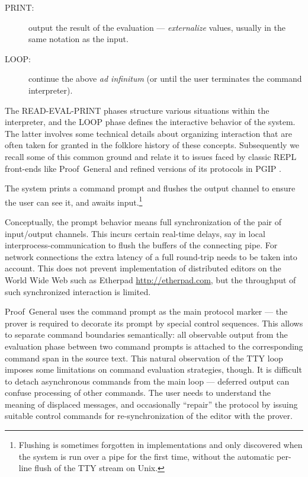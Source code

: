 \begin{isabellebody}
\begin{isamarkuptext}
\begin{description}
  \item[PRINT:] output the result of the evaluation ---
  \emph{externalize} values, usually in the same notation as the
  input.

  \item[LOOP:] continue the above \emph{ad infinitum} (or until the user
  terminates the command interpreter).

  \end{description}

  The READ-EVAL-PRINT phases structure various situations within the
  interpreter, and the LOOP phase defines the interactive behavior of
  the system.  The latter involves some technical details about
  organizing interaction that are often taken for granted in the
  folklore history of these concepts.  Subsequently we recall some of
  this common ground and relate it to issues faced by classic REPL
  front-ends like Proof~General \cite{Aspinall:TACAS:2000} and refined
  versions of its protocols in PGIP \cite{Aspinall-et-al:2007}.

   The system prints a command prompt and flushes the
  output channel to ensure the user can see it, and awaits
  input.\footnote{Flushing is sometimes forgotten in implementations
  and only discovered when the system is run over a pipe for the first
  time, without the automatic per-line flush of the TTY stream on
  Unix.}

  Conceptually, the prompt behavior means full synchronization of the
  pair of input/output channels.  This incurs certain real-time
  delays, say in local interprocess-communication to flush the buffers
  of the connecting pipe.  For network connections the extra latency
  of a full round-trip needs to be taken into account.  This does not
  prevent implementation of distributed editors on the World Wide Web
  such as Etherpad \url{http://etherpad.com}, but the throughput of
  such synchronized interaction is limited.

  Proof~General uses the command prompt as the main protocol marker
  --- the prover is required to decorate its prompt by special control
  sequences.  This allows to separate command boundaries semantically:
  all observable output from the evaluation phase between two command
  prompts is attached to the corresponding command span in the source
  text.  This natural observation of the TTY loop imposes some
  limitations on command evaluation strategies, though.  It is
  difficult to detach asynchronous commands from the main loop ---
  deferred output can confuse processing of other commands.  The user
  needs to understand the meaning of displaced messages, and
  occasionally ``repair'' the protocol by issuing suitable control
  commands for re-synchronization of the editor with the prover.


\end{isamarkuptext}
\end{isabellebody}

